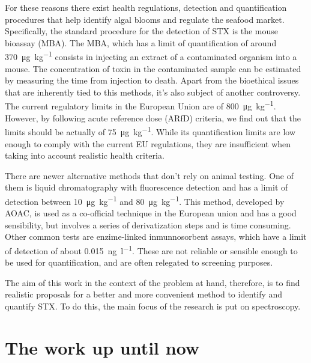 For these reasons there exist health regulations, detection and quantification procedures that help identify algal blooms and regulate the seafood market.
Specifically, the standard procedure for the detection of STX is the mouse bioassay (MBA).
The MBA, which has a limit of quantification of around \SI{370}{\micro\gram\per\kilo\gram} consists in injecting an extract of a contaminated organism into a mouse.
The concentration of toxin in the contaminated sample can be estimated by measuring the time from injection to death.\cite{who84}
Apart from the bioethical issues that are inherently tied to this methods, it's also subject of another controversy.
The current regulatory limits in the European Union are of \SI{800}{\micro\gram\per\kilo\gram}.
However, by following acute reference dose (ARfD) criteria, we find out that the limits should be actually of \SI{75}{\micro\gram\per\kilo\gram}.
While its quantification limits are low enough to comply with the current EU regulations, they are insufficient when taking into account realistic health criteria.

There are newer alternative methods that don't rely on animal testing.
One of them is liquid chromatography with fluorescence detection and has a limit of detection between \SI{10}{\micro\gram\per\kilo\gram} and \SI{80}{\micro\gram\per\kilo\gram}.\cite{eu17,aoac16}
This method, developed by AOAC, is used as a co-official technique in the European union and has a good sensibility, but involves a series of derivatization steps and is time consuming.
Other common tests are enzime-linked inmunnosorbent assays, which have a limit of detection of about \SI{0.015}{\nano\gram\per\litre}.\cite{wharton17}
These are not reliable or sensible enough to be used for quantification, and are often relegated to screening purposes.

The aim of this work in the context of the problem at hand, therefore, is to find realistic proposals for a better and more convenient method to identify and quantify STX.
To do this, the main focus of the research is put on spectroscopy.

\section{The work up until now}

